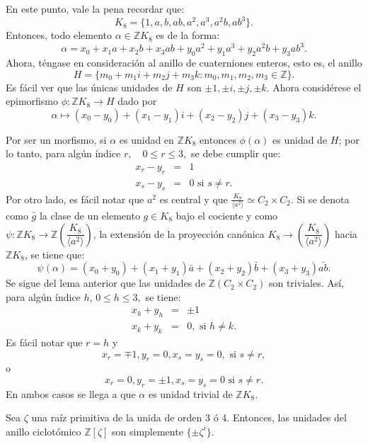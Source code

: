 \begin{proof*}
En este punto, vale la pena recordar que: \[ K_8 = \{ 1,a,b,ab,a^2,a^3,a^2b,ab^3  \}.\] Entonces, todo elemento $\alpha \in \mathds{Z}K_8$ es de la forma: \[ \alpha = x_0 + x_1a + x_2b + x_3ab + y_0a^2 + y_1a^3 + y_2a^2b + y_3ab^3.\] Ahora, téngase en consideración al anillo de cuaterniones enteros, esto es, el anillo \[ H = \{ m_0 + m_1i+ m_2j +m_3k \colon m_0, m_1, m_2, m_3 \in \mathds{Z} \}.\] Es fácil ver que las únicas unidades de $H$ son $\pm 1, \pm i, \pm j, \pm k.$ Ahora considérese el epimorfismo $\phi \colon \mathds{Z}K_8 \to H$ dado por \[ \alpha \mapsto (x_0 - y_0) + (x_1 - y_1)i + (x_2 - y_2)j +(x_3-y_3)k. \]

Por ser un morfismo, si $\alpha$ es unidad en $\mathds{Z}K_8$ entonces $\phi(\alpha)$ es unidad de $H$; por lo tanto, para algún índice $r, \quad 0 \leq r \leq 3,$ se debe cumplir que: 
\begin{eqnarray*}
x_r - y_r &=&1 \\  
x_s - y_s &=& 0 \mbox{ si } s \neq r .
\end{eqnarray*}
\indent Por otro lado, es fácil notar que $a^2$  es central y que $\frac{K_8}{\langle a^2\rangle} \simeq C_2 \times C_2.$ Si se denota como $\bar{g}$ la clase de un elemento $g \in K_8$ bajo el cociente y como $\psi \colon \mathds{Z}K_8 \to \mathds{Z}\left(\dfrac{K_8}{\langle a^2\rangle}\right)$, la extensión de la proyección canónica $K_8 \to \left( \dfrac{K_8}{\langle a^2\rangle} \right)$ hacia $\mathds{Z}K_8$, se tiene que: \[ \psi(\alpha) = (x_0 + y_0) +(x_1 + y_1) \bar{a} + (x_2 + y_2)\bar{b} + (x_3+y_3)\bar{ab}.\] \indent Se sigue del lema anterior que las unidades de $\mathds{Z}(C_2\times C_2)$ son triviales. Así, para algún índice $h$, $0\leq h \leq 3,$ se tiene: 
 \begin{eqnarray*}
 x_h + y_h &=& \pm 1 \\
 x_k + y_k &=& 0, \mbox{ si } h \neq k.
 \end{eqnarray*}
 Es fácil notar que $r = h$ y \[ x_r = \mp 1, y_r =0, x_s = y_s =0, \mbox{ si } s \neq r, \] o 
 \[ x_r =0 , y_r = \pm 1, x_s = y_s = 0 \mbox{ si } s \neq r.  \] En ambos casos se llega a que $\alpha$ es unidad trivial de $\mathds{Z}K_8$.
\end{proof*}
\begin{lema}\label{lema:tercerLema}
Sea $\zeta$ una raíz primitiva de la unida de orden 3 ó 4. Entonces, las unidades del anillo ciclotómico $\mathds{Z}[\zeta]$ son simplemente $\{\pm \zeta^{i} \}$.
\end{lema}
